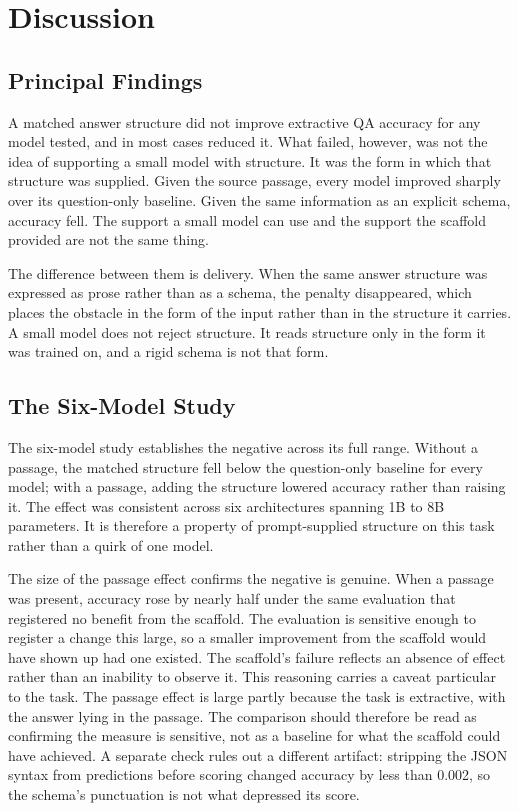 \documentclass[master]{thesis}
\begin{document}
\chapter{Discussion}
\label{ch:discussion}

\section{Principal Findings}

A matched answer structure did not improve extractive QA accuracy for any model tested, and in most cases reduced it. What failed, however, was not the idea of supporting a small model with structure. It was the form in which that structure was supplied. Given the source passage, every model improved sharply over its question-only baseline. Given the same information as an explicit schema, accuracy fell. The support a small model can use and the support the scaffold provided are not the same thing.

The difference between them is delivery. When the same answer structure was expressed as prose rather than as a schema, the penalty disappeared, which places the obstacle in the form of the input rather than in the structure it carries. A small model does not reject structure. It reads structure only in the form it was trained on, and a rigid schema is not that form.

\section{The Six-Model Study}
\label{sec:sixmodel-disc}

The six-model study establishes the negative across its full range. Without a passage, the matched structure fell below the question-only baseline for every model; with a passage, adding the structure lowered accuracy rather than raising it. The effect was consistent across six architectures spanning 1B to 8B parameters. It is therefore a property of prompt-supplied structure on this task rather than a quirk of one model.

The size of the passage effect confirms the negative is genuine. When a passage was present, accuracy rose by nearly half under the same evaluation that registered no benefit from the scaffold. The evaluation is sensitive enough to register a change this large, so a smaller improvement from the scaffold would have shown up had one existed. The scaffold's failure reflects an absence of effect rather than an inability to observe it. This reasoning carries a caveat particular to the task. The passage effect is large partly because the task is extractive, with the answer lying in the passage. The comparison should therefore be read as confirming the measure is sensitive, not as a baseline for what the scaffold could have achieved. A separate check rules out a different artifact: stripping the JSON syntax from predictions before scoring changed accuracy by less than 0.002, so the schema's punctuation is not what depressed its score.
\end{document}
